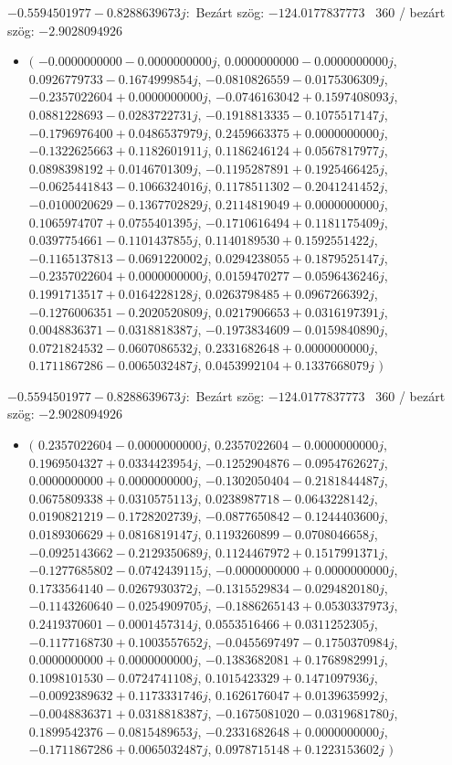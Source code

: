 \documentclass[14pt,a4paper]{article}
\begin{document}
$-0.5594501977-0.8288639673j$:\
Bezárt szög: $-124.0177837773$ \
360 / bezárt szög: $-2.9028094926$\
\begin{itemize}
\item
$\big($
$-0.0000000000-0.0000000000j$, $0.0000000000-0.0000000000j$, $0.0926779733-0.1674999854j$, $-0.0810826559-0.0175306309j$, $-0.2357022604+0.0000000000j$, $-0.0746163042+0.1597408093j$, $0.0881228693-0.0283722731j$, $-0.1918813335-0.1075517147j$, $-0.1796976400+0.0486537979j$, $0.2459663375+0.0000000000j$, $-0.1322625663+0.1182601911j$, $0.1186246124+0.0567817977j$, $0.0898398192+0.0146701309j$, $-0.1195287891+0.1925466425j$, $-0.0625441843-0.1066324016j$, $0.1178511302-0.2041241452j$, $-0.0100020629-0.1367702829j$, $0.2114819049+0.0000000000j$, $0.1065974707+0.0755401395j$, $-0.1710616494+0.1181175409j$, $0.0397754661-0.1101437855j$, $0.1140189530+0.1592551422j$, $-0.1165137813-0.0691220002j$, $0.0294238055+0.1879525147j$, $-0.2357022604+0.0000000000j$, $0.0159470277-0.0596436246j$, $0.1991713517+0.0164228128j$, $0.0263798485+0.0967266392j$, $-0.1276006351-0.2020520809j$, $0.0217906653+0.0316197391j$, $0.0048836371-0.0318818387j$, $-0.1973834609-0.0159840890j$, $0.0721824532-0.0607086532j$, $0.2331682648+0.0000000000j$, $0.1711867286-0.0065032487j$, $0.0453992104+0.1337668079j$
$\big)$
\end{itemize}
$-0.5594501977-0.8288639673j$:\
Bezárt szög: $-124.0177837773$ \
360 / bezárt szög: $-2.9028094926$\
\begin{itemize}
\item
$\big($
$0.2357022604-0.0000000000j$, $0.2357022604-0.0000000000j$, $0.1969504327+0.0334423954j$, $-0.1252904876-0.0954762627j$, $0.0000000000+0.0000000000j$, $-0.1302050404-0.2181844487j$, $0.0675809338+0.0310575113j$, $0.0238987718-0.0643228142j$, $0.0190821219-0.1728202739j$, $-0.0877650842-0.1244403600j$, $0.0189306629+0.0816819147j$, $0.1193260899-0.0708046658j$, $-0.0925143662-0.2129350689j$, $0.1124467972+0.1517991371j$, $-0.1277685802-0.0742439115j$, $-0.0000000000+0.0000000000j$, $0.1733564140-0.0267930372j$, $-0.1315529834-0.0294820180j$, $-0.1143260640-0.0254909705j$, $-0.1886265143+0.0530337973j$, $0.2419370601-0.0001457314j$, $0.0553516466+0.0311252305j$, $-0.1177168730+0.1003557652j$, $-0.0455697497-0.1750370984j$, $0.0000000000+0.0000000000j$, $-0.1383682081+0.1768982991j$, $0.1098101530-0.0724741108j$, $0.1015423329+0.1471097936j$, $-0.0092389632+0.1173331746j$, $0.1626176047+0.0139635992j$, $-0.0048836371+0.0318818387j$, $-0.1675081020-0.0319681780j$, $0.1899542376-0.0815489653j$, $-0.2331682648+0.0000000000j$, $-0.1711867286+0.0065032487j$, $0.0978715148+0.1223153602j$
$\big)$
\end{itemize}
\end{document}
